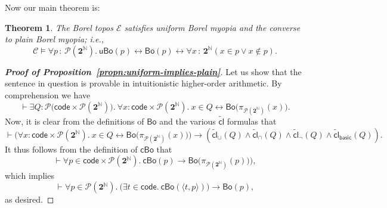 \documentclass[11pt]{amsart}
\newcommand\basic{\mathsf{basic}}
\newcommand\Bo{\mathsf{Bo}}
\newcommand\br[1]{\langle{}#1\rangle{}}
\newcommand\cBo{\mathsf{cBo}}
\newcommand\cC{\mathcal{C}}
\newcommand\cE{\mathcal{E}}
\newcommand\cl{\mathsf{cl}}
\newcommand\code{\mathsf{code}}
\newcommand{\N}{\mathbb{N}}
\newcommand\pBig[1]{\Big({#1}\Big)}
\newcommand\pbig[1]{\big({#1}\big)}
\newcommand\pow{\mathcal{P}}
\newcommand\tolon{{\,:\,}}
\newcommand\tot{\leftrightarrow}
\newcommand\two{\mathbf{2}}
\newcommand\uBo{\mathsf{uBo}}
\newcommand\wt[1]{\widetilde{#1}}
\theoremstyle{definition}
\theoremstyle{remark}
\theoremstyle{plain}
\newtheorem{thm}[defn]{Theorem}
\begin{document}
Now our main theorem is:
\begin{thm} \label{thm:uniform-borel-myopia}
  The Borel topos \( \cE \) satisfies uniform Borel myopia and the converse to plain Borel myopia; i.e.,
  \[
    \cC \vDash
    \forall p \tolon \pow(\two^\N).\
    \uBo(p)
    \tot
    \Bo(p)
    \tot
    \forall x \tolon \two^\N (x \in p \vee x \notin p).
  \]
\end{thm}

\begin{proof}[\textbf{\textup{Proof of Proposition~\ref{propn:uniform-implies-plain}}}]
  Let us show that the sentence in question is provable in intuitionistic higher-order arithmetic.
  By comprehension we have
  \[
    \vdash
    \exists Q \colon \pow\pbig{\code \times \pow(\two^\N)}.\
    \forall x \colon \code \times \pow(\two^\N).\
    x \in Q
    \tot
    \Bo\pbig{\pi_{\pow(\two^\N)}(x)}.
  \]
  Now, it is clear from the definitions of \( \Bo \) and the various \( \wt\cl \) formulas that
  \[
    \vdash
    \pBig{
      \forall x \colon \code \times \pow(\two^\N).\
      x \in Q
      \tot
      \Bo\pbig{\pi_{\pow(\two^\N)}(x)}
    } \to
    (\wt{\cl}_{\cup}(Q) \wedge \wt{\cl}_{\cap}(Q) \wedge \wt{\cl}_{\neg}(Q) \wedge \wt{\cl}_{\basic}(Q)).
  \]
  It thus follows from the definition of \( \cBo \) that
  \[
    \vdash
    \forall p \in \code \times \pow(\two^\N).\
    \cBo(p) \to \Bo\pbig{\pi_{\pow(\two^\N)}(p))},
  \]
  which implies
  \[
    \vdash
    \forall p \in \pow(\two^\N).\
    \pbig{\exists t \in \code.\ \cBo(\br{t, p})}
    \to
    \Bo(p),
  \]
  as desired.
\end{proof}
\end{document}
